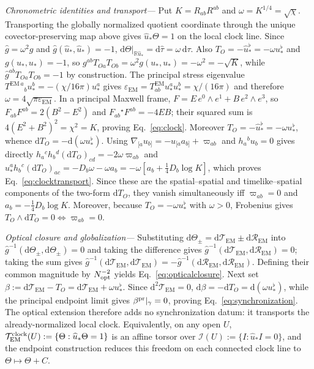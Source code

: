 \documentclass[aps,prl,reprint]{revtex4-2}
\newcommand{\EM}{\mathrm{EM}}
\newcommand{\dd}{\mathrm d}
\begin{document}
\textit{Chronometric identities and transport---}
Put $K=R_{ab}R^{ab}$ and $\omega=K^{1/4}=\sqrt\chi$. Transporting the globally normalized quotient coordinate through the unique covector-preserving map above gives $\widehat u_*\Theta=1$ on the local clock line. Since $\widehat g=\omega^2g$ and $\widehat g(\widehat u_*,\widehat u_*)=-1$,
$\left.\dd\Theta\right|_{\mathbb R\widehat u_*} = \dd\widehat\tau = \omega\,\dd\tau .$ Also $T_O=-\widehat u_*^\flat=-\omega u_*^\flat$ and
$g(u_*,u_*)=-1$, so
$g^{ab}T_{Oa}T_{Ob}=\omega^2g(u_*,u_*)=-\omega^2=-\sqrt K$,
while $\widehat g^{ab}T_{Oa}T_{Ob}=-1$ by construction. The principal stress eigenvalue $T^{\EM\,a}{}_bu_*^b=-(\chi/16\pi)u_*^a$ gives $\varepsilon_{\EM}=T^{\EM}_{ab}u_*^au_*^b=\chi/(16\pi)$ and therefore $\omega=4\sqrt{\pi\varepsilon_{\EM}}$. In a principal Maxwell frame, $F=E\,e^0\wedge e^1+B\,e^2\wedge e^3$, so $F_{ab}F^{ab}=2(B^2-E^2)$ and $F_{ab}{}^\star F^{ab}=-4EB$; their squared sum is $4(E^2+B^2)^2=\chi^2=K$, proving Eq.~\eqref{eq:clock}. Moreover $T_O=-\widehat u_*^\flat=-\omega u_*^\flat$, whence $\dd T_O=-\dd(\omega u_*^\flat)$. Using $\nabla_{[a}u_{b]}=-u_{[a}a_{b]}+\varpi_{ab}$ and $h_a{}^bu_b=0$ gives directly $h_a{}^ch_b{}^d(\dd T_O)_{cd}=-2\omega\varpi_{ab}$ and $u_*^ah_b{}^c(\dd T_O)_{ac}=-D_b\omega-\omega a_b=-\omega[a_b+\tfrac14D_b\log K]$, which proves Eq.~\eqref{eq:clocktransport}. Since these are the spatial--spatial and timelike--spatial components of the two-form $\dd T_O$, they vanish simultaneously iff
$\varpi_{ab}=0$ and
$a_b=-\tfrac14D_b\log K$.
Moreover, because $T_O=-\omega u_*^\flat$ with $\omega>0$,
Frobenius gives
$T_O\wedge\dd T_O=0\iff\varpi_{ab}=0$.

\textit{Optical closure and globalization---}
Substituting $\dd\Theta_\pm=\dd\mathcal T_{\EM}\pm\dd\mathcal R_{\EM}$ into $\widehat g^{-1}(\dd\Theta_\pm,\dd\Theta_\pm)=0$ and taking the difference gives $\widehat g^{-1}(\dd\mathcal T_{\EM},\dd\mathcal R_{\EM})=0$; taking the sum gives $\widehat g^{-1}(\dd\mathcal T_{\EM},\dd\mathcal T_{\EM})=-\widehat g^{-1}(\dd\mathcal R_{\EM},\dd\mathcal R_{\EM})$. Defining their common magnitude by $N_{\rm opt}^{-2}$ yields Eq.~\eqref{eq:opticalclosure}. Next set $\beta:=\dd\mathcal T_{\EM}-T_O=\dd\mathcal T_{\EM}+\omega u_*^\flat$. Since $\dd^2\mathcal T_{\EM}=0$,
$\dd\beta=-\dd T_O=\dd(\omega u_*^\flat)$, while the principal endpoint limit gives $\beta^{\rm pr}|_\gamma=0$, proving Eq.~\eqref{eq:synchronization}. The optical extension therefore adds no synchronization datum: it transports the already-normalized local clock. Equivalently, on any open $U$, $\mathcal T_{\EM}^{\rm clock}(U):=\{\Theta:\widehat u_*\Theta=1\}$ is an affine torsor over $\mathcal I(U):=\{I:\widehat u_*I=0\}$, and the endpoint construction reduces this freedom on each connected clock line to $\Theta\mapsto\Theta+C$.
\end{document}
